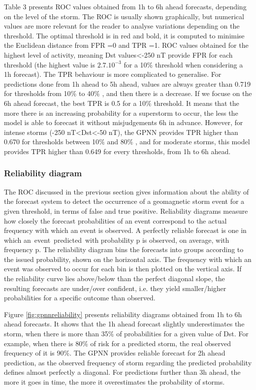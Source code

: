 Table 3 presents ROC values obtained from 1h to 6h ahead forecasts, depending on the level of the storm. 
The ROC is usually shown graphically, but numerical values are more relevant for the reader to analyse 
variations depending on the threshold. The optimal threshold is in red and bold, it is computed to 
minimise the Euclidean distance from FPR =0 and TPR =1. ROC values obtained for the highest level of activity, 
meaning Dst values<-250 nT provide FPR for each threshold 
(the highest value is $2.7.10^{-3}$ for a 10$\%$  threshold when considering a 1h forecast). 
The TPR behaviour is more complicated to generalise. For predictions done from 1h ahead to 5h ahead, 
values are always greater than 0.719 for thresholds from 10$\%$  to 40$\%$ , and then there is a decrease. 
If we focuse on the 6h ahead forecast, the best TPR is 0.5 for a 10$\%$  threshold. It means that the more 
there is an increasing probability for a superstorm to occur, the less the model is able to forecast it 
without misjudgements 6h in advance. However, for intense storms (-250 nT<Dst<-50 nT), the GPNN provides 
TPR higher than 0.670 for thresholds between 10$\%$  and 80$\%$ , and for moderate storms, this model provides 
TPR higher than 0.649 for every thresholds, from 1h to 6h ahead. 


\subsubsection{Reliability diagram}


The ROC discussed in the previous section gives information about the ability of the forecast system to 
detect the occurrence of a geomagnetic storm event for a given threshold, in terms of false and true positive. 
Reliability diagrams measure how closely the forecast probabilities of an event correspond to the actual 
frequency with which an event is observed. A perfectly reliable forecast is one in which an\ event\ predicted\ 
with probability p is observed, on average, with frequency p. The reliability diagram bins the forecasts into 
groups according to the issued probability, shown on the horizontal axis. The frequency with which an event was 
observed to occur for each bin is then plotted on the vertical axis.  If the reliability curve lies above/below 
than the perfect diagonal slope, the resulting forecasts  are under/over confident, i.e. they yield  
smaller/higher probabilities for a specific outcome than observed. 


Figure \ref{fig:gpnnreliability} presents reliability diagrams obtained from 1h to 6h ahead forecasts. 
It shows that the 1h ahead forecast slightly underestimates the storm, when there is more than 35$\%$  of 
probabilities for a given value of Dst. For example, when there is 80$\%$  of risk for a predicted storm, 
the real observed frequency of it is 90$\%$. The GPNN provides reliable forecast for 2h ahead prediction, 
as the observed frequency of storm regarding the predicted probability defines almost perfectly a diagonal. 
For predictions further than 3h ahead, the more it goes in time, the more it overestimates the probability of storms. 

